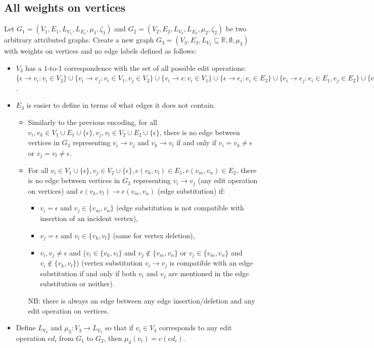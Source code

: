 \documentclass{article}
\theoremstyle{definition}
\begin{document}
\subsection{All weights on vertices}
Let $G_1 = (V_1, E_1, L_{V_1}, L_{E_1}, \mu_1, \zeta_1)$ and $G_2 = (V_2, E_2, L_{V_2}, L_{E_2}, \mu_2, \zeta_2)$ be two arbitrary attributed graphs. Create a new graph $G_3 = (V_3, E_3, L_{V_3} \subseteq \mathbb{R}, \emptyset, \mu_3)$ with weights on vertices and no edge labels defined as follows:
\begin{itemize}
\item $V_3$ has a 1-to-1 correspondence with the set of all possible edit operations: $\{ \epsilon \to v_i : v_i \in V_2 \} \cup \{ v_i \to v_j : v_i \in V_1, v_j \in V_2 \} \cup \{ v_i \to \epsilon : v_i \in V_1 \} \cup \{ \epsilon \to e_i : e_i \in E_2 \} \cup \{ e_i \to e_j : e_i \in E_1, e_j \in E_2 \} \cup \{ e_i \to \epsilon : e_i \in E_1 \}$.
\item  $E_3$ is easier to define in terms of what edges it does not contain.
  \begin{itemize}
  \item Similarly to the previous encoding, for all $v_i, v_k \in V_1 \cup E_1 \cup \{ \epsilon \}, v_j, v_l \in V_2 \cup E_2 \cup \{ \epsilon \}$, there is no edge between vertices in $G_3$ representing $v_i \to v_j$ and $v_k \to v_l$ if and only if $v_i = v_k \ne \epsilon$ or $v_j = v_l \ne \epsilon$.
  \item For all $v_i \in V_1 \cup \{ \epsilon \}, v_j \in V_2 \cup \{ \epsilon \}, e(v_k, v_l) \in E_1, e(v_m, v_n) \in E_2$, there is no edge between vertices in $G_3$ representing $v_i \to v_j$ (any edit operation on vertices) and $e(v_k, v_l) \to e(v_m, v_n)$ (edge substitution) if:
    \begin{itemize}
    \item $v_i = \epsilon$ and $v_j \in \{ v_m, v_n \}$ (edge substitution is not compatible with insertion of an incident vertex),
    \item $v_j = \epsilon$ and $v_i \in \{ v_k, v_l \}$ (same for vertex deletion),
    \item $v_i, v_j \ne \epsilon$ and ($v_i \in \{ v_k, v_l \}$ and $v_j \not \in \{ v_m, v_n \}$ or $v_j \in \{ v_m, v_n \}$ and $v_i \not \in \{ v_k, v_l \}$) (vertex substitution $v_i \to v_j$ is compatible with an edge substitution if and only if both $v_i$ and $v_j$ are mentioned in the edge substitution or neither).
    \end{itemize}
    NB: there is always an edge between any edge insertion/deletion and any edit operation on vertices.
  \end{itemize}
\item Define $L_{V_3}$ and $\mu_3: V_3 \to L_{V_3}$ so that if $v_i \in V_3$ corresponds to any edit operation $ed_i$ from $G_1$ to $G_2$, then $\mu_3(v_i) = c(ed_i)$.
\end{itemize}
\end{document}

